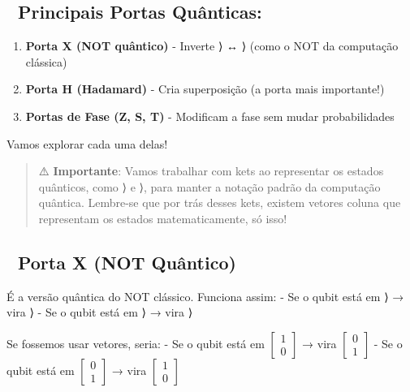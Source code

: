 \documentclass[
  brazilian,
]{report}
\providecommand{\tightlist}{%
  \setlength{\itemsep}{0pt}\setlength{\parskip}{0pt}}
\begin{document}
\subsection{🔄 Principais Portas
Quânticas:}\label{principais-portas-quuxe2nticas}

\begin{enumerate}
\def\labelenumi{\arabic{enumi}.}
\tightlist
\item
  \textbf{Porta X (NOT quântico)} - Inverte ⟩ ↔ ⟩
  (como o NOT da computação clássica)
\item
  \textbf{Porta H (Hadamard)} - Cria superposição (a porta mais
  importante!)
\item
  \textbf{Portas de Fase (Z, S, T)} - Modificam a fase sem mudar
  probabilidades
\end{enumerate}

Vamos explorar cada uma delas!

\begin{quote}
⚠️ \textbf{Importante}: Vamos trabalhar com kets ao representar os
estados quânticos, como ⟩ e ⟩, para manter a notação
padrão da computação quântica. Lembre-se que por trás desses kets,
existem vetores coluna que representam os estados matematicamente, só
isso!
\end{quote}

\subsection{🚪 Porta X (NOT Quântico)}\label{porta-x-not-quuxe2ntico}

É a versão quântica do NOT clássico. Funciona assim: - Se o qubit está
em ⟩ → vira ⟩ - Se o qubit está em ⟩ → vira
⟩

Se fossemos usar vetores, seria: - Se o qubit está em
\(\begin{bmatrix} 1 \\ 0 \end{bmatrix}\) → vira
\(\begin{bmatrix} 0 \\ 1 \end{bmatrix}\) - Se o qubit está em
\(\begin{bmatrix} 0 \\ 1 \end{bmatrix}\) → vira
\(\begin{bmatrix} 1 \\ 0 \end{bmatrix}\)
\end{document}
